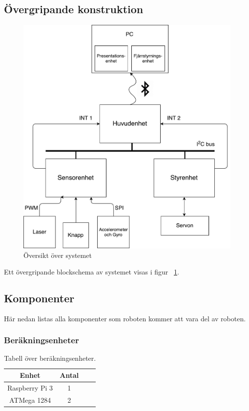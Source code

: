 \documentclass{article}
\begin{document}
\subsection{Övergripande konstruktion}
\begin{figure}[H]
\centering
\includegraphics[scale=0.35]{oversikt_systemet}
\caption{Översikt över systemet}
\label{fig:oversikt_systemet}
\end{figure}
Ett övergripande blockschema av systemet visas i figur ~\ref{fig:oversikt_systemet}.

\subsection{Komponenter}
Här nedan listas alla komponenter som roboten kommer att vara del av roboten.

\subsubsection{Beräkningsenheter}
\begin{table}[H]
  \centering
  \begin{tabular}{ | c | c | c | c |}
    \hline
    \textbf{Enhet} & \textbf{Antal} \\
    \hline
    Raspberry Pi 3 & 1 \\
    \hline
    ATMega 1284 & 2 \\
    \hline
  \end{tabular}
  \caption{ Tabell över beräkningsenheter. }
\end{table}
\end{document}
